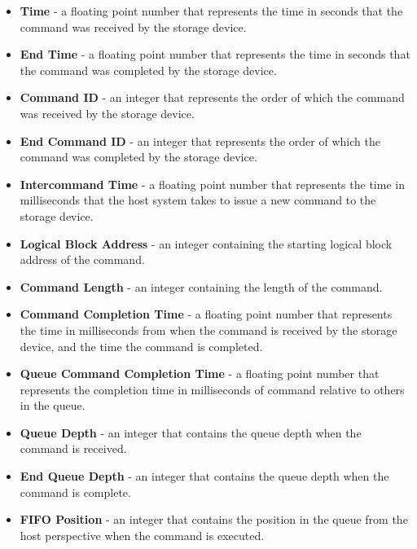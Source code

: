 \documentclass[journal]{vgtc}                %
\begin{document}
\begin{itemize}
\item \textbf{Time} - a floating point number that represents the time in seconds that the command was received by the storage device.

\item \textbf{End Time} - a floating point number that represents the time in seconds that the command was completed by the storage device.

\item \textbf{Command ID} - an integer that represents the order of which the command was received by the storage device.

\item \textbf{End Command ID} - an integer that represents the order of which the command was completed by the storage device.

\item \textbf{Intercommand Time} - a floating point number that represents the time in milliseconds that the host system takes to issue a new command to the storage device.

\item \textbf{Logical Block Address} - an integer containing the starting logical block address of the command.

\item \textbf{Command Length} - an integer containing the length of the command.

\item \textbf{Command Completion Time} - a floating point number that represents the time in milliseconds from when the command is received by the storage device, and the time the command is completed.

\item \textbf{Queue Command Completion Time} - a floating point number that represents the completion time in milliseconds of command relative to others in the queue.

\item \textbf{Queue Depth} - an integer that contains the queue depth when the command is received.

\item \textbf{End Queue Depth} - an integer that contains the queue depth when the command is complete.

\item \textbf{FIFO Position} - an integer that contains the position in the queue from the host perspective when the command is executed.


\end{itemize}
\end{document}
